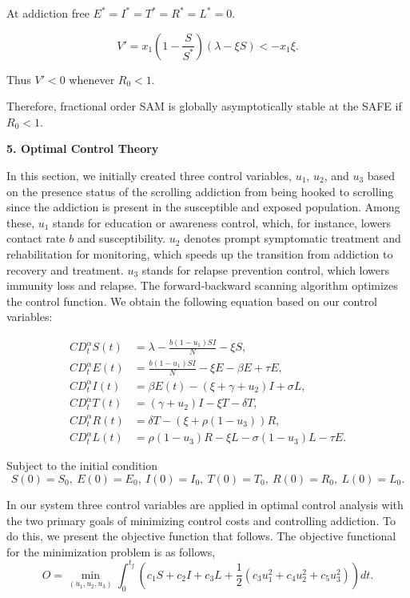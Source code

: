 \documentclass[10pt]{NSP1}
\begin{document}
	At addiction free \(E^{*} = I^{*} = T^{*} = R^{*} = L^{*} = 0\).
	
	\[
	V' = x_{1}\left(1-\frac{S}{S^{*}}\right)(\lambda - \xi S) < -x_{1}\xi. \tag{4.13}
	\]
	
	Thus \(V' < 0\) whenever \(R_{0} < 1\).
	
	Therefore, fractional order SAM is globally asymptotically stable at the SAFE if \(R_{0} < 1\).
	
	\par\medskip\noindent \begin{center}\normalsize\bfseries 5. Optimal Control Theory\end{center}\smallskip
	
	In this section, we initially created three control variables, \(u_{1}\), \(u_{2}\), and \(u_{3}\) based on the presence status of the scrolling addiction from being hooked to scrolling since the addiction is present in the susceptible and exposed population. Among these, \(u_{1}\) stands for education or awareness control, which, for instance, lowers contact rate \(b\) and susceptibility. \(u_{2}\) denotes prompt symptomatic treatment and rehabilitation for monitoring, which speeds up the transition from addiction to recovery and treatment. \(u_{3}\) stands for relapse prevention control, which lowers immunity loss and relapse. The forward-backward scanning algorithm optimizes the control function. We obtain the following equation based on our control variables:
	
	\[
	\begin{aligned}
		CD_{t}^{\alpha} S(t) &= \lambda - \frac{b(1-u_1) S I}{N} - \xi S, \\
		CD_{t}^{\alpha} E(t) &= \frac{b(1-u_1) S I}{N} - \xi E - \beta E + \tau E, \\
		CD_{t}^{\alpha} I(t) &= \beta E(t) - (\xi + \gamma + u_2) I + \sigma L, \\
		CD_{t}^{\alpha} T(t) &= (\gamma+u_2) I - \xi T - \delta T, \\
		CD_{t}^{\alpha} R(t) &= \delta T - (\xi + \rho(1-u_3)) R, \\
		CD_{t}^{\alpha} L(t) &= \rho(1-u_3) R - \xi L - \sigma(1-u_3) L - \tau E.
	\end{aligned} \tag{5.1}
	\]
	
	Subject to the initial condition
	\[
	S(0)=S_0,\ E(0)=E_0,\ I(0)=I_0,\ T(0)=T_0,\ R(0)=R_0,\ L(0)=L_0. \tag{5.2}
	\]
	
	In our system three control variables are applied in optimal control analysis with the two primary goals of minimizing control costs and controlling addiction. To do this, we present the objective function that follows. The objective functional for the minimization problem is as follows,
	\[
	O = \min_{(u_1,u_2,u_3)} \int_{0}^{t_f} \left( c_1 S + c_2 I + c_3 L + \frac{1}{2}\left( c_3 u_1^2 + c_4 u_2^2 + c_5 u_3^2 \right) \right) dt. \tag{5.3}
	\]
	
\end{document}
